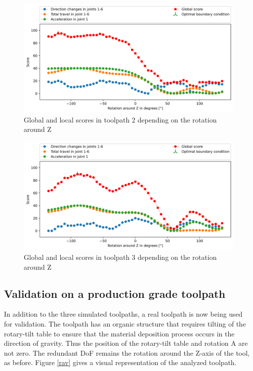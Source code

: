 \begin{figure}[H]
\centerline{\includegraphics[width=1\textwidth]{figures/best_c_2_combi.png}}
\caption{Global and local scores in toolpath 2 depending on the rotation around Z}
\label{TP2_combi}
\end{figure}
\begin{figure}[H]
\centerline{\includegraphics[width=1\textwidth]{figures/best_c_3_combi.png}}
\caption{Global and local scores in toolpath 3 depending on the rotation around Z}
\label{TP3_combi}
\end{figure}

\newpage
\subsection{Validation on a production grade toolpath}\label{RG}
In addition to the three simulated toolpaths, a real toolpath is now being used for validation. The toolpath has an organic structure that requires tilting of the rotary-tilt table to ensure that the material deposition process occurs in the direction of gravity. Thus the position of the rotary-tilt table and rotation A are not zero. The redundant \acrshort{DoF} remains the rotation around the Z-axis of the tool, as before. Figure \ref{rav} gives a visual representation of the analyzed toolpath.

